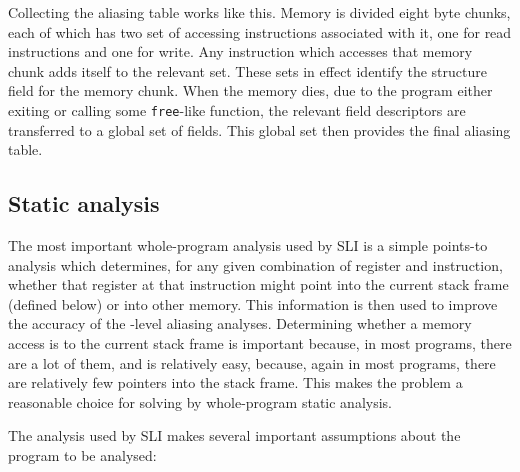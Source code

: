 Collecting the aliasing table works like this.  Memory is divided
eight byte chunks, each of which has two set of accessing instructions
associated with it, one for read instructions and one for write.  Any
instruction which accesses that memory chunk adds itself to the
relevant set.  These sets in effect identify the structure field for
the memory chunk.  When the memory dies, due to the program either
exiting or calling some \verb|free|-like function, the relevant field
descriptors are transferred to a global set of fields.  This global
set then provides the final aliasing table.


\subsection{Static analysis}


The most important whole-program analysis used by SLI is a simple
points-to analysis which determines, for any given combination of
register and instruction, whether that register at that instruction
might point into the current stack frame (defined below) or into other
memory.  This information is then used to improve the accuracy of the
\StateMachine-level aliasing analyses.  Determining whether a memory
access is to the current stack frame is important because, in most
programs, there are a lot of them, and is relatively easy, because,
again in most programs, there are relatively few pointers into the
stack frame.  This makes the problem a reasonable choice for solving
by whole-program static analysis.

The analysis used by SLI makes several important assumptions about the
program to be analysed:

